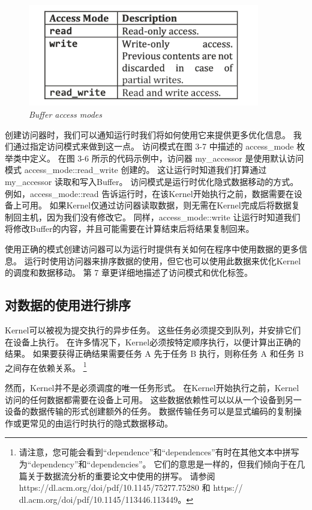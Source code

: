 \begin{figure}[H]
	\centering
	\includegraphics[width=0.9\textwidth]{figs/F3.7.png}
	\caption{\textit{Buffer access modes}}
\end{figure}

创建访问器时，我们可以通知运行时我们将如何使用它来提供更多优化信息。 我们通过指定访问模式来做到这一点。 
访问模式在图 3-7 中描述的 access\_mode 枚举类中定义。 
在图 3-6 所示的代码示例中，访问器 my\_accessor 是使用默认访问模式 access\_mode::read\_write 创建的。 
这让运行时知道我们打算通过 my\_accessor 读取和写入Buffer。 访问模式是运行时优化隐式数据移动的方式。 
例如，access\_mode::read 告诉运行时，在该Kernel开始执行之前，数据需要在设备上可用。 
如果Kernel仅通过访问器读取数据，则无需在Kernel完成后将数据复制回主机，因为我们没有修改它。 
同样，access\_mode::write 让运行时知道我们将修改Buffer的内容，并且可能需要在计算结束后将结果复制回来。

使用正确的模式创建访问器可以为运行时提供有关如何在程序中使用数据的更多信息。 
运行时使用访问器来排序数据的使用，但它也可以使用此数据来优化Kernel的调度和数据移动。 
第 7 章更详细地描述了访问模式和优化标签。

\subsection{对数据的使用进行排序}
Kernel可以被视为提交执行的异步任务。 这些任务必须提交到队列，并安排它们在设备上执行。 
在许多情况下，Kernel必须按特定顺序执行，以便计算出正确的结果。 
如果要获得正确结果需要任务 A 先于任务 B 执行，则称任务 A 和任务 B 之间存在依赖关系。
\footnote{请注意，您可能会看到“dependence”和“dependences”有时在其他文本中拼写为“dependency”和“dependencies”。
它们的意思是一样的，但我们倾向于在几篇关于数据流分析的重要论文中使用的拼写。
请参阅 https://dl.acm.org/doi/pdf/10.1145/75277.75280 
和 https:// dl.acm.org/doi/pdf/10.1145/113446.113449。}

然而，Kernel并不是必须调度的唯一任务形式。 在Kernel开始执行之前，Kernel访问的任何数据都需要在设备上可用。 
这些数据依赖性可以以从一个设备到另一设备的数据传输的形式创建额外的任务。 
数据传输任务可以是显式编码的复制操作或更常见的由运行时执行的隐式数据移动。


